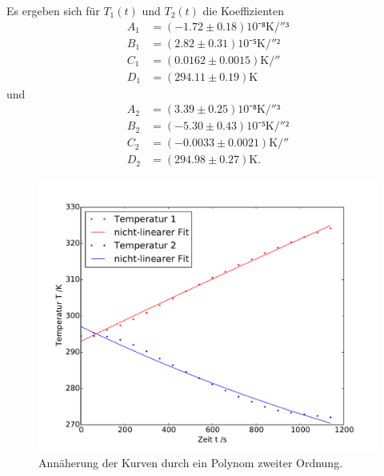 Es ergeben sich für $T_1(t)$ und $T_2(t)$ die Koeffizienten 
\begin{equation}
\begin{split}
	A_1&=(-1.72\pm0.18)10⁻⁸\si{\kelvin\per{\second}³}\\
	B_1&=(2.82\pm0.31)10⁻⁵\si{\kelvin\per{\second}²}\\
	C_1&=(0.0162\pm0.0015)\si{\kelvin\per{\second}}\\
	D_1&=(294.11\pm0.19)\si{\kelvin}
\end{split}
\end{equation}
und
\begin{equation}
\begin{split}
	A_2&=(3.39\pm0.25)10⁻⁸\si{\kelvin\per{\second}³}\\
	B_2&=(-5.30\pm0.43)10⁻⁵\si{\kelvin\per{\second}²}\\
	C_2&=(-0.0033\pm0.0021)\si{\kelvin\per{\second}}\\
	D_2&=(294.98\pm0.27)\si{\kelvin}.
\end{split}
\end{equation}
\begin{figure}
	\includegraphics[width=\textwidth]{Bilder/Temperaturfit_Grad2.pdf}
	\caption{Annäherung der Kurven durch ein Polynom zweiter Ordnung.}
\end{figure}
